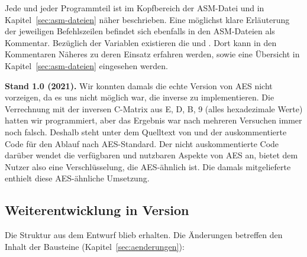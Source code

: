 Jede  und jeder Programmteil ist im Kopfbereich der ASM-Datei und in Kapitel~\ref{sec:asm-dateien} näher beschrieben. Eine möglichst klare Erläuterung der jeweiligen Befehlszeilen befindet sich ebenfalls in den ASM-Dateien als Kommentar. Bezüglich der Variablen existieren die  und . Dort kann in den Kommentaren Näheres zu deren Einsatz erfahren werden, sowie eine Übersicht in Kapitel~\ref{sec:asm-dateien} eingesehen werden.

\textbf{Stand 1.0 (2021).} Wir konnten damals die echte Version von AES nicht vorzeigen, da es uns nicht möglich war, die inverse  zu implementieren. Die Verrechnung mit der inversen C-Matrix aus E, D, B, 9 (alles hexadezimale Werte) hatten wir programmiert, aber das Ergebnis war nach mehreren Versuchen immer noch falsch. Deshalb steht unter dem Quelltext von  und  der auskommentierte Code für den Ablauf nach AES-Standard. Der nicht auskommentierte Code darüber wendet die verfügbaren und nutzbaren Aspekte von AES an, bietet dem Nutzer also eine Verschlüsselung, die AES-ähnlich ist. Die damals mitgelieferte  enthielt diese AES-ähnliche Umsetzung.

\subsection{Weiterentwicklung in Version \versionProjekt}\label{sec:entwurf-v2}
Die Struktur aus dem Entwurf blieb erhalten. Die Änderungen betreffen den Inhalt der Bausteine (Kapitel~\ref{sec:aenderungen}):

